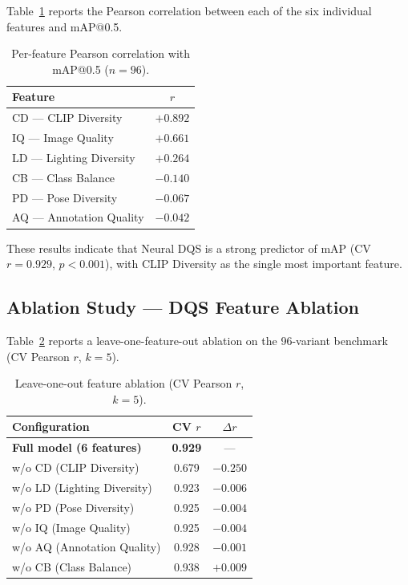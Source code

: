 \documentclass[11pt]{article}
\begin{document}
Table~\ref{tab:feature-corr} reports the Pearson correlation between each of
the six individual features and mAP@0.5.

\begin{table}[h]
\centering
\caption{Per-feature Pearson correlation with mAP@0.5 ($n=96$).}
\label{tab:feature-corr}
\begin{tabular}{@{}lc@{}}
\toprule
Feature & $r$ \\
\midrule
CD --- CLIP Diversity & $+0.892$ \\
IQ --- Image Quality  & $+0.661$ \\
LD --- Lighting Diversity & $+0.264$ \\
CB --- Class Balance  & $-0.140$ \\
PD --- Pose Diversity & $-0.067$ \\
AQ --- Annotation Quality & $-0.042$ \\
\bottomrule
\end{tabular}
\end{table}

These results indicate that Neural DQS is a strong predictor of mAP (CV
$r=0.929$, $p<0.001$), with CLIP Diversity as the single most important
feature.

\subsection{Ablation Study --- DQS Feature Ablation}
\label{sec:dqs-ablation}

Table~\ref{tab:ablation} reports a leave-one-feature-out ablation on the
96-variant benchmark (CV Pearson $r$, $k=5$).

\begin{table}[h]
\centering
\caption{Leave-one-out feature ablation (CV Pearson $r$, $k=5$).}
\label{tab:ablation}
\begin{tabular}{@{}lcc@{}}
\toprule
Configuration & CV $r$ & $\Delta r$ \\
\midrule
\textbf{Full model (6 features)} & \textbf{0.929} & --- \\
w/o CD (CLIP Diversity) & 0.679 & $-0.250$ \\
w/o LD (Lighting Diversity) & 0.923 & $-0.006$ \\
w/o PD (Pose Diversity) & 0.925 & $-0.004$ \\
w/o IQ (Image Quality) & 0.925 & $-0.004$ \\
w/o AQ (Annotation Quality) & 0.928 & $-0.001$ \\
w/o CB (Class Balance) & 0.938 & $+0.009$ \\
\bottomrule
\end{tabular}
\end{table}
\end{document}
